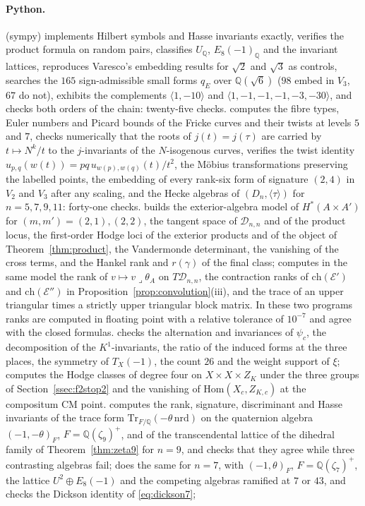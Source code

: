 \documentclass[11pt,reqno]{amsart}
\numberwithin{equation}{section}
\theoremstyle{plain}
\theoremstyle{definition}
\newcommand{\QQ}{\mathbb{Q}}
\newcommand{\Hom}{\mathrm{Hom}}
\newcommand{\ch}{\mathrm{ch}}
\newcommand{\Tr}{\mathrm{Tr}}
\newcommand{\cD}{\mathcal{D}}
\begin{document}
\paragraph{Python.}  (sympy) implements Hilbert symbols and Hasse invariants exactly, verifies the product formula on random pairs, classifies $U_{\QQ}$, $E_{8}(-1)_{\QQ}$ and the invariant lattices, reproduces Varesco's embedding results for $\sqrt2$ and $\sqrt3$ as controls, searches the $165$ sign-admissible small forms $q_{E}$ over $\QQ(\sqrt6)$ ($98$ embed in $V_{3}$, $67$ do not), exhibits the complements $\langle1,-10\rangle$ and $\langle1,-1,-1,-1,-3,-30\rangle$, and checks both orders of the chain: twenty-five checks.  computes the fibre types, Euler numbers and Picard bounds of the Fricke curves and their twists at levels $5$ and $7$, checks numerically that the roots of $j(t)=j(\tau)$ are carried by $t\mapsto N^{k}/t$ to the $j$-invariants of the $N$-isogenous curves, verifies the twist identity $u_{p,q}(w(t))=pq\,u_{w(p),w(q)}(t)/t^{2}$, the M\"obius transformations preserving the labelled points, the embedding of every rank-six form of signature $(2,4)$ in $V_{2}$ and $V_{3}$ after any scaling, and the Hecke algebras of $(D_{n},\langle\tau\rangle)$ for $n=5,7,9,11$: forty-one checks.  builds the exterior-algebra model of $H^{*}(A\times A')$ for $(m,m')=(2,1),(2,2)$, the tangent space of $\cD_{n,n}$ and of the product locus, the first-order Hodge loci of the exterior products and of the object of Theorem~\ref{thm:product}, the Vandermonde determinant, the vanishing of the cross terms, and the Hankel rank and $r(\gamma)$ of the final class;  computes in the same model the rank of $v\mapsto v\lrcorner\theta_{A}$ on $T\cD_{n,n}$, the contraction ranks of $\ch(\mathcal{E}')$ and $\ch(\mathcal{E}'')$ in Proposition~\ref{prop:convolution}(iii), and the trace of an upper triangular times a strictly upper triangular block matrix. In these two programs ranks are computed in floating point with a relative tolerance of $10^{-7}$ and agree with the closed formulas.  checks the alternation and invariances of $\psi_{c}$, the decomposition of the $K^{1}$-invariants, the ratio of the induced forms at the three places, the symmetry of $T_{X}(-1)$, the count $26$ and the weight support of $\xi$;  computes the Hodge classes of degree four on $X\times X\times Z_{K}$ under the three groups of Section~\ref{ssec:f2stop2} and the vanishing of $\Hom(X_{c},Z_{K,c})$ at the compositum CM point.  computes the rank, signature, discriminant and Hasse invariants of the trace form $\Tr_{F/\QQ}(-\theta\,\mathrm{nrd})$ on the quaternion algebra $(-1,-\theta)_{F}$, $F=\QQ(\zeta_{9})^{+}$, and of the transcendental lattice of the dihedral family of Theorem~\ref{thm:zeta9} for $n=9$, and checks that they agree while three contrasting algebras fail;  does the same for $n=7$, with $(-1,\theta)_{F}$, $F=\QQ(\zeta_{7})^{+}$, the lattice $U^{2}\oplus E_{8}(-1)$ and the competing algebras ramified at $7$ or $43$, and checks the Dickson identity of \eqref{eq:dickson7}; 
\end{document}
